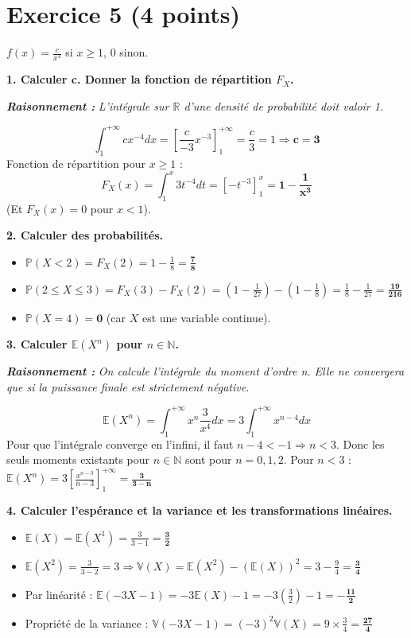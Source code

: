 \documentclass[11pt,a4paper]{article}
\newcommand{\raisonnement}[1]{
    \vspace{0.2cm}
    \noindent\textcolor{blue!70!black}{
        \textbf{\textit{Raisonnement : }} \textit{#1}
    }
    \vspace{0.2cm}
}
\begin{document}
\vspace{0.5cm}
\section*{Exercice 5 (4 points)}

$f(x) = \frac{c}{x^4}$ si $x \ge 1$, 0 sinon.

\textbf{1. Calculer c. Donner la fonction de répartition $F_X$.}
\raisonnement{L'intégrale sur $\mathbb{R}$ d'une densité de probabilité doit valoir 1.}
$$ \int_1^{+\infty} c x^{-4} dx = \left[ \frac{c}{-3} x^{-3} \right]_1^{+\infty} = \frac{c}{3} = 1 \Rightarrow \mathbf{c = 3} $$
Fonction de répartition pour $x \ge 1$ :
$$ F_X(x) = \int_1^x 3t^{-4} dt = \left[ -t^{-3} \right]_1^x = \mathbf{1 - \frac{1}{x^3}} $$
(Et $F_X(x) = 0$ pour $x < 1$).

\textbf{2. Calculer des probabilités.}
\begin{itemize}
    \item $\mathbb{P}(X < 2) = F_X(2) = 1 - \frac{1}{8} = \mathbf{\frac{7}{8}}$
    \item $\mathbb{P}(2 \le X \le 3) = F_X(3) - F_X(2) = \left(1 - \frac{1}{27}\right) - \left(1 - \frac{1}{8}\right) = \frac{1}{8} - \frac{1}{27} = \mathbf{\frac{19}{216}}$
    \item $\mathbb{P}(X = 4) = \mathbf{0}$ (car $X$ est une variable continue).
\end{itemize}

\textbf{3. Calculer $\mathbb{E}(X^n)$ pour $n \in \mathbb{N}$.}
\raisonnement{On calcule l'intégrale du moment d'ordre n. Elle ne convergera que si la puissance finale est strictement négative.}
$$ \mathbb{E}(X^n) = \int_1^{+\infty} x^n \frac{3}{x^4} dx = 3 \int_1^{+\infty} x^{n-4} dx $$
Pour que l'intégrale converge en l'infini, il faut $n-4 < -1 \Rightarrow n < 3$.
Donc les seuls moments existants pour $n \in \mathbb{N}$ sont pour $n=0, 1, 2$.
Pour $n < 3$ : $\mathbb{E}(X^n) = 3 \left[ \frac{x^{n-3}}{n-3} \right]_1^{+\infty} = \mathbf{\frac{3}{3-n}}$

\textbf{4. Calculer l'espérance et la variance et les transformations linéaires.}
\begin{itemize}
    \item $\mathbb{E}(X) = \mathbb{E}(X^1) = \frac{3}{3-1} = \mathbf{\frac{3}{2}}$
    \item $\mathbb{E}(X^2) = \frac{3}{3-2} = 3 \Rightarrow \mathbb{V}(X) = \mathbb{E}(X^2) - (\mathbb{E}(X))^2 = 3 - \frac{9}{4} = \mathbf{\frac{3}{4}}$
    \item Par linéarité : $\mathbb{E}(-3X-1) = -3\mathbb{E}(X) - 1 = -3\left(\frac{3}{2}\right) - 1 = \mathbf{-\frac{11}{2}}$
    \item Propriété de la variance : $\mathbb{V}(-3X-1) = (-3)^2 \mathbb{V}(X) = 9 \times \frac{3}{4} = \mathbf{\frac{27}{4}}$
\end{itemize}
\end{document}

